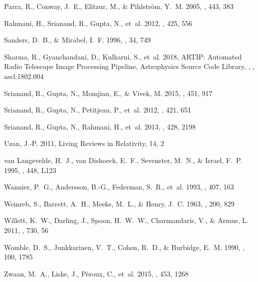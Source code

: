 \documentclass[iop,apjl,numberedappendix,appendixfloats,twocolappendix,revtex4]{emulateapj}
\begin{document}
\begin{thebibliography}{}
{Parra}, R., {Conway}, J.~E., {Elitzur}, M., \& {Pihlstr{\"o}m}, Y.~M. 2005,
  \aap, 443, 383

{Rahmani}, H., {Srianand}, R., {Gupta}, N., {et~al.} 2012, \mnras, 425, 556

{Sanders}, D.~B., \& {Mirabel}, I.~F. 1996, \araa, 34, 749

{Sharma}, R., {Gyanchandani}, D., {Kulkarni}, S., {et~al.} 2018, {ARTIP:
  Automated Radio Telescope Image Processing Pipeline}, Astrophysics Source
  Code Library, , , ascl:1802.004

{Srianand}, R., {Gupta}, N., {Momjian}, E., \& {Vivek}, M. 2015, \mnras, 451,
  917

{Srianand}, R., {Gupta}, N., {Petitjean}, P., {et~al.} 2012, \mnras, 421, 651

{Srianand}, R., {Gupta}, N., {Rahmani}, H., {et~al.} 2013, \mnras, 428, 2198

{Uzan}, J.-P. 2011, Living Reviews in Relativity, 14, 2

{van Langevelde}, H.~J., {van Dishoeck}, E.~F., {Sevenster}, M.~N., \&
  {Israel}, F.~P. 1995, \apjl, 448, L123

{Wannier}, P.~G., {Andersson}, B.-G., {Federman}, S.~R., {et~al.} 1993, \apj,
  407, 163

{Weinreb}, S., {Barrett}, A.~H., {Meeks}, M.~L., \& {Henry}, J.~C. 1963, \nat,
  200, 829

{Willett}, K.~W., {Darling}, J., {Spoon}, H.~W.~W., {Charmandaris}, V., \&
  {Armus}, L. 2011, \apj, 730, 56

{Womble}, D.~S., {Junkkarinen}, V.~T., {Cohen}, R.~D., \& {Burbidge}, E.~M.
  1990, \aj, 100, 1785

{Zwaan}, M.~A., {Liske}, J., {P{\'e}roux}, C., {et~al.} 2015, \mnras, 453, 1268

\end{thebibliography}
\end{document}
